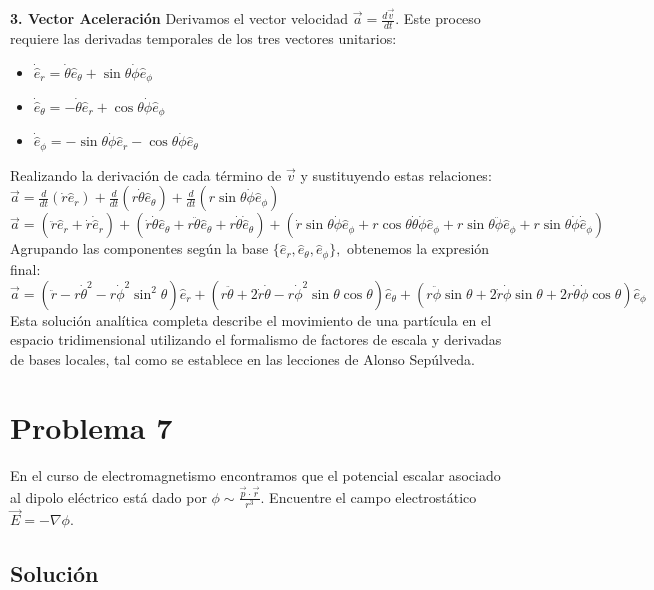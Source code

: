 \documentclass[a4paper]{article}
\begin{document}
\textbf{3. Vector Aceleración}
Derivamos el vector velocidad $\vec{a} = \frac{d\vec{v}}{dt}.$ Este proceso requiere las derivadas temporales de los tres vectores unitarios:
\begin{itemize}
    \item $\dot{\hat{e}}_r = \dot{\theta} \hat{e}_\theta + \sin\theta \dot{\phi} \hat{e}_\phi$
    \item $\dot{\hat{e}}_\theta = -\dot{\theta} \hat{e}_r + \cos\theta \dot{\phi} \hat{e}_\phi$
    \item $\dot{\hat{e}}_\phi = -\sin\theta \dot{\phi} \hat{e}_r - \cos\theta \dot{\phi} \hat{e}_\theta$
\end{itemize}
Realizando la derivación de cada término de $\vec{v}$ y sustituyendo estas relaciones:
$\vec{a} = \frac{d}{dt}(\dot{r}\hat{e}_r) + \frac{d}{dt}(r\dot{\theta}\hat{e}_\theta) + \frac{d}{dt}(r\sin\theta\dot{\phi}\hat{e}_\phi)$
$\vec{a} = (\ddot{r}\hat{e}_r + \dot{r}\dot{\hat{e}}_r) + (\dot{r}\dot{\theta}\hat{e}_\theta + r\ddot{\theta}\hat{e}_\theta + r\dot{\theta}\dot{\hat{e}}_\theta) + (\dot{r}\sin\theta\dot{\phi}\hat{e}_\phi + r\cos\theta\dot{\theta}\dot{\phi}\hat{e}_\phi + r\sin\theta\ddot{\phi}\hat{e}_\phi + r\sin\theta\dot{\phi}\dot{\hat{e}}_\phi)$
Agrupando las componentes según la base $\{\hat{e}_r, \hat{e}_\theta, \hat{e}_\phi\},$ obtenemos la expresión final:
\begin{equation}
\vec{a} = (\ddot{r} - r\dot{\theta}^2 - r\dot{\phi}^2 \sin^2\theta) \hat{e}_r + (r\ddot{\theta} + 2\dot{r}\dot{\theta} - r\dot{\phi}^2 \sin\theta \cos\theta) \hat{e}_\theta + (r\ddot{\phi}\sin\theta + 2\dot{r}\dot{\phi}\sin\theta + 2r\dot{\theta}\dot{\phi}\cos\theta) \hat{e}_\phi
\end{equation}
Esta solución analítica completa describe el movimiento de una partícula en el espacio tridimensional utilizando el formalismo de factores de escala y derivadas de bases locales, tal como se establece en las lecciones de Alonso Sepúlveda.


\section{Problema 7}
En el curso de electromagnetismo encontramos que el potencial escalar asociado al dipolo eléctrico está dado por $\phi \sim \frac{\vec{p}\cdot\vec{r}}{r^3}$. Encuentre el campo electrostático $\vec{E} = -\nabla\phi.$

\subsection{Solución}
\end{document}
